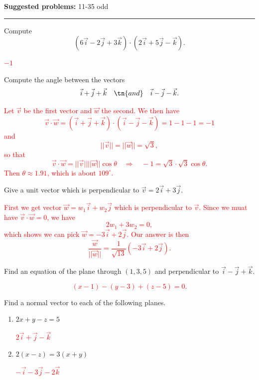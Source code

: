 \documentclass[12pt,reqno]{amsart}
\begin{document}
\textbf{Suggested problems:} 11-35 odd

\bigskip
\hrule

\bigskip

\prob Compute
	\[(6\vec{i} -2\vec{j} + 3\vec{k}) \cdot (2\vec{i}+5\vec{j}-\vec{k}).
	\]
	
\medskip
\textcolor{red}{$-1$}
\medskip	

\prob Compute the angle between the vectors
	\[\vec{i} + \vec{j} + \vec{k} \quad \tn{and} \quad \vec{i} -\vec{j} - \vec{k}.
	\]

\bigskip
\textcolor{red}{Let $\vec{v}$ be the first vector and $\vec{w}$ the second. We then have
	\[\vec{v} \cdot \vec{w} = (\vec{i} + \vec{j} + \vec{k}) \cdot (\vec{i} -\vec{j} - \vec{k}) = 1 -1 -1 = -1
	\]
and
	\[||\vec{v}|| = ||\vec{w}|| = \sqrt{3},
	\]
so that
	\[\vec{v} \cdot \vec{w} = ||\vec{v}|| ||\vec{w}|| \cos{\theta} \quad \Rightarrow \quad -1 = \sqrt{3} \cdot \sqrt{3} \cos{\theta}.
	\]
Then $\theta \approx 1.91$, which is about $109^\circ$.}
\bigskip

\prob Give a unit vector which is perpendicular to $\vec{v} = 2\vec{i} +3\vec{j}$.

\bigskip
\textcolor{red}{ First we get vector $\vec{w} = w_1 \vec{i} + w_2 \vec{j}$ which is perpendicular to $\vec{v}$. Since we muat have $\vec{v} \cdot \vec{w}=0$, we have
	\[2w_1 + 3w_2=0,
	\]
which shows we can pick $\vec{w} = -3\vec{i} + 2\vec{j}$. Our answer is then
	\[\frac{\vec{w}}{||\vec{w}||} = \frac{1}{\sqrt{13}} (-3\vec{i} + 2\vec{j}).
	\]}
\bigskip

\prob Find an equation of the plane through $(1,3,5)$ and perpendicular to $\vec{i} - \vec{j} + \vec{k}$.

\bigskip
\textcolor{red}{
	\[(x-1) - (y-3) + (z-5) = 0.
	\]}

\prob Find a normal vector to each of the following planes.

\medskip
\begin{enumerate}
\item $2x+y-z=5$

\bigskip
\textcolor{red}{$2\vec{i} + \vec{j} - \vec{k}$}
\bigskip

\item $2(x-z) = 3(x+y)$

\bigskip
\textcolor{red}{$-\vec{i}-3\vec{j}-2\vec{k}$}
\bigskip

\end{enumerate}
\end{document}
